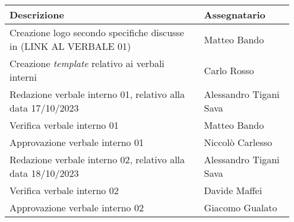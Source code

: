 \begin{center}
{
\renewcommand{\arraystretch}{1.5}
\begin{tabular}{p{0.65\linewidth}|p{0.30\linewidth}}
    \textbf{Descrizione}    &   \textbf{Assegnatario}  \\
    \hline
    Creazione logo secondo specifiche discusse in (LINK AL VERBALE 01)  & Matteo Bando              \\
    \hline
    Creazione \textit{template} relativo ai verbali interni             & Carlo Rosso               \\
    \hline
    Redazione verbale interno 01, relativo alla data 17/10/2023         & Alessandro Tigani Sava    \\
    \hline
    Verifica verbale interno 01                                         & Matteo Bando              \\
    \hline
    Approvazione verbale interno 01                                     & Niccolò Carlesso          \\
    \hline
    Redazione verbale interno 02, relativo alla data 18/10/2023         & Alessandro Tigani Sava    \\
    \hline
    Verifica verbale interno 02                                         & Davide Maffei             \\
    \hline
    Approvazione verbale interno 02                                     & Giacomo Gualato           \\
\end{tabular}
}
\end{center}